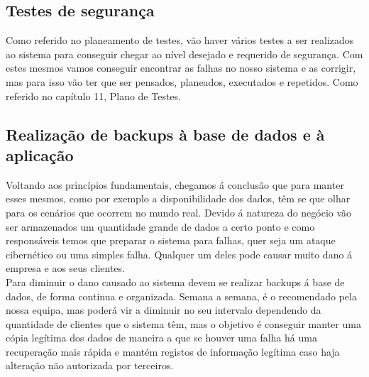 \subsection{Testes de segurança}
Como referido no planeamento de testes, vão haver vários testes a ser realizados ao sistema para conseguir chegar ao nível desejado e requerido de segurança. Com estes mesmos vamos conseguir encontrar as falhas no nosso sistema e as corrigir, mas para isso vão ter que ser pensados, planeados, executados e repetidos. Como referido no capítulo 11, Plano de Testes.\\

\subsection{Realização de backups à base de dados e à aplicação}
Voltando aos princípios fundamentais, chegamos á conclusão que para manter esses mesmos, como por exemplo a disponibilidade dos dados, têm se que olhar para os cenários que ocorrem no mundo real. Devido á natureza do negócio vão ser armazenados um quantidade grande de dados a certo ponto e como responsáveis temos que preparar o sistema para falhas, quer seja um ataque cibernético ou uma simples falha. Qualquer um deles pode causar muito dano á empresa e aos seus clientes.\\
Para diminuir o dano causado ao sistema devem se realizar backups á base de dados, de forma continua e organizada. Semana a semana, é o recomendado pela nossa equipa, mas poderá vir a diminuir no seu intervalo dependendo da quantidade de clientes que o sistema têm, mas o objetivo é conseguir manter uma cópia legítima dos dados de maneira a que se houver uma falha há uma recuperação mais rápida e mantém registos de informação legítima caso haja alteração não autorizada por terceiros.